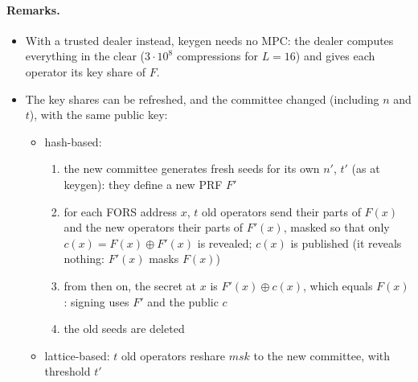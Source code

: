 \documentclass[11pt]{article}
\begin{document}
\paragraph{Remarks.}
\begin{itemize}
  \item With a trusted dealer instead, keygen needs no MPC: the dealer computes everything in the clear
        ($3\cdot10^8$ compressions for $L=16$) and gives each operator its key share of $F$.
  \item The key shares can be refreshed, and the committee changed (including $n$ and $t$), with the same
        public key:
  \begin{itemize}
    \item hash-based:
    \begin{enumerate}
      \item the new committee generates fresh seeds for its own $n'$, $t'$ (as at keygen): they define a
            new PRF $F'$
      \item for each FORS address $x$, $t$ old operators send their parts of $F(x)$ and the new operators
            their parts of $F'(x)$, masked so that only $c(x)=F(x)\oplus F'(x)$ is revealed; $c(x)$ is
            published (it reveals nothing: $F'(x)$ masks $F(x)$)
      \item from then on, the secret at $x$ is $F'(x)\oplus c(x)$, which equals $F(x)$: signing uses $F'$
            and the public $c$
      \item the old seeds are deleted
    \end{enumerate}
    \item lattice-based: $t$ old operators reshare $\mathit{msk}$ to the new committee, with threshold $t'$
  \end{itemize}
\end{itemize}
\end{document}
